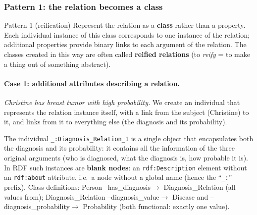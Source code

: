 \subsubsection{Pattern 1: the relation becomes a class}

\begin{nbfact}{Pattern 1 (reification)}
Represent the relation as a \textbf{class} rather than a property. Each individual
instance of this class corresponds to one instance of the relation; additional
properties provide binary links to each argument of the relation. The classes created in
this way are often called \textbf{reified relations} (to \emph{reify} = to make a thing
out of something abstract).
\end{nbfact}

\paragraph{Case 1: additional attributes describing a relation.}
\emph{Christine has breast tumor with high probability.} We create an individual that
represents the relation instance itself, with a link from the subject (Christine) to it,
and links from it to everything else (the diagnosis and its probability).

\begin{center}
\end{center}

The individual \texttt{\_:Diagnosis\_Relation\_1} is a single object that encapsulates
both the diagnosis and its probability: it contains all the information of the three
original arguments (who is diagnosed, what the diagnosis is, how probable it is). In RDF
such instances are \textbf{blank nodes}: an \texttt{rdf:Description} element without an
\texttt{rdf:about} attribute, i.e.\ a node without a global name (hence the
``\texttt{\_:}'' prefix). Class definitions: Person --has\_diagnosis$\to$
Diagnosis\_Relation (all values from); Diagnosis\_Relation --diagnosis\_value$\to$ Disease
and --diagnosis\_probability$\to$ Probability (both functional: exactly one value).

